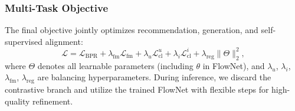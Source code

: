 \subsubsection{\textbf{Multi-Task Objective}}
The final objective jointly optimizes recommendation, generation, and self-supervised alignment:
\begin{equation}
	\mathcal{L} = \mathcal{L}_{\text{BPR}} + \lambda_{\text{fm}} \mathcal{L}_{\text{fm}} + \lambda_{u} \mathcal{L}_{\text{cl}}^u + \lambda_{i} \mathcal{L}_{\text{cl}}^i + \lambda_{\text{reg}} \|\Theta\|_2^2,
\end{equation}
where $\Theta$ denotes all learnable parameters (including $\theta$ in FlowNet), and $\lambda_{u}$, $\lambda_{i}$, $\lambda_{\text{fm}}$, $\lambda_{\text{reg}}$ are  balancing hyperparameters. During inference, we discard the contrastive branch and utilize the trained FlowNet with flexible steps for high-quality refinement.




